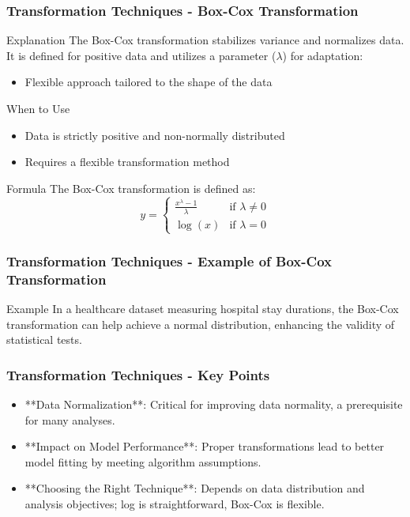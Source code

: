 \documentclass[aspectratio=169]{beamer}
\begin{document}
\begin{frame}[fragile]
    \frametitle{Transformation Techniques - Box-Cox Transformation}
    \begin{block}{Explanation}
        The Box-Cox transformation stabilizes variance and normalizes data. It is defined for positive data and utilizes a parameter (\(\lambda\)) for adaptation:
        \begin{itemize}
            \item Flexible approach tailored to the shape of the data
        \end{itemize}
    \end{block}

    \begin{block}{When to Use}
        \begin{itemize}
            \item Data is strictly positive and non-normally distributed
            \item Requires a flexible transformation method
        \end{itemize}
    \end{block}
    
    \begin{block}{Formula}
        The Box-Cox transformation is defined as:
        \[
        y = 
        \begin{cases} 
            \frac{x^\lambda - 1}{\lambda} & \text{if } \lambda \neq 0 \\
            \log(x) & \text{if } \lambda = 0 
        \end{cases} 
        \]
    \end{block}
\end{frame}

\begin{frame}[fragile]
    \frametitle{Transformation Techniques - Example of Box-Cox Transformation}
    \begin{block}{Example}
        In a healthcare dataset measuring hospital stay durations, the Box-Cox transformation can help achieve a normal distribution, enhancing the validity of statistical tests.
    \end{block}
\end{frame}

\begin{frame}[fragile]
    \frametitle{Transformation Techniques - Key Points}
    \begin{itemize}
        \item **Data Normalization**: Critical for improving data normality, a prerequisite for many analyses.
        \item **Impact on Model Performance**: Proper transformations lead to better model fitting by meeting algorithm assumptions.
        \item **Choosing the Right Technique**: Depends on data distribution and analysis objectives; log is straightforward, Box-Cox is flexible.
    \end{itemize}
\end{frame}
\end{document}
